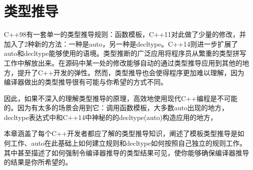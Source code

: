 \chapter{类型推导}
C++98有一套单一的类型推导规则：函数模板，C++11对此做了少量的修改，并加入了2种新的方法：一种是{\M auto}，另一种是{\M decltype}。C++14则进一步扩展了{\M auto}和{\M decltype}能够使用的语境。类型推断的广泛应用将程序员从繁重的类型拼写工作中解放出来。在源码中某一处的修改能够自动的通过类型推导应用到其他的地方，提升了C++开发的弹性。然而，类型推导也会使得程序更加难以理解，因为编译器做出的类型推导很有可能与你希望的方式不同。

因此，如果不深入的理解类型推导的原理，高效地使用现代C++编程是不可能的。因为有太多的场景会用到它：调用函数模板，大多数{\M auto}出现的地方，{\M decltype}表达式中和C++14中神秘的的{\M decltype(auto)}构造应用的地方，

本章涵盖了每个C++开发者都应了解的类型推导知识，阐述了模板类型推导是如何工作、{\M auto}在此基础上如何建立规则和{\M decltype}如何按照自己独立的规则工作。其中甚至描述了如何强制令编译器推导的类型结果可见，使你能够确保编译器推导的结果是你所希望的。





